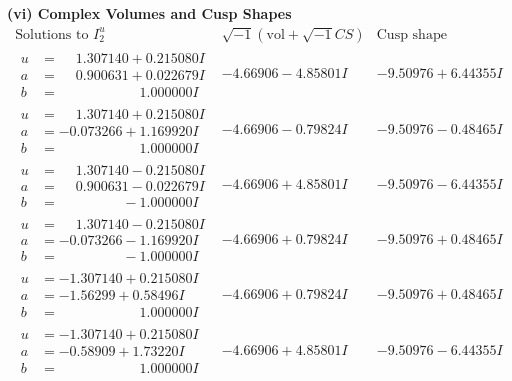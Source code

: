 \documentclass[1p]{elsarticle_modified}
\theoremstyle{definition}
\newcommand{\I}{\sqrt{-1}}
\begin{document}
\newpage\flushleft \textbf{(vi) Complex Volumes and Cusp Shapes}
$$\begin{array}{c|c|c}  
\text{Solutions to }I^u_{2}& \I (\text{vol} + \sqrt{-1}CS) & \text{Cusp shape}\\
 \hline 
\begin{aligned}
u &= \phantom{-}1.307140 + 0.215080 I \\
a &= \phantom{-}0.900631 + 0.022679 I \\
b &= \phantom{-0.000000 -}1.000000 I\end{aligned}
 & -4.66906 - 4.85801 I & -9.50976 + 6.44355 I \\ \hline\begin{aligned}
u &= \phantom{-}1.307140 + 0.215080 I \\
a &= -0.073266 + 1.169920 I \\
b &= \phantom{-0.000000 -}1.000000 I\end{aligned}
 & -4.66906 - 0.79824 I & -9.50976 - 0.48465 I \\ \hline\begin{aligned}
u &= \phantom{-}1.307140 - 0.215080 I \\
a &= \phantom{-}0.900631 - 0.022679 I \\
b &= \phantom{-0.000000 } -1.000000 I\end{aligned}
 & -4.66906 + 4.85801 I & -9.50976 - 6.44355 I \\ \hline\begin{aligned}
u &= \phantom{-}1.307140 - 0.215080 I \\
a &= -0.073266 - 1.169920 I \\
b &= \phantom{-0.000000 } -1.000000 I\end{aligned}
 & -4.66906 + 0.79824 I & -9.50976 + 0.48465 I \\ \hline\begin{aligned}
u &= -1.307140 + 0.215080 I \\
a &= -1.56299 + 0.58496 I \\
b &= \phantom{-0.000000 -}1.000000 I\end{aligned}
 & -4.66906 + 0.79824 I & -9.50976 + 0.48465 I \\ \hline\begin{aligned}
u &= -1.307140 + 0.215080 I \\
a &= -0.58909 + 1.73220 I \\
b &= \phantom{-0.000000 -}1.000000 I\end{aligned}
 & -4.66906 + 4.85801 I & -9.50976 - 6.44355 I \\ \hline\begin{aligned}

\end{aligned}
\end{array}$$
\end{document}

